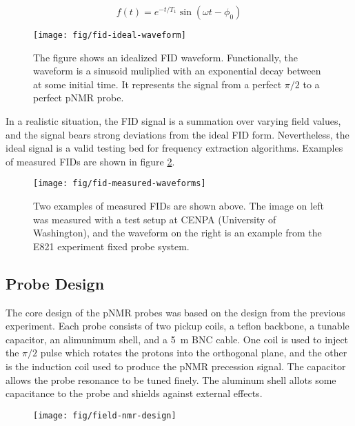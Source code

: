 \begin{equation}
f(t) = e^{-t/T_1} \sin(\omega t - \phi_0)
\label{eqn:ideal-fid}
\end{equation}

\begin{figure}
\label{fig:fid-ideal-waveform}
\centering
\texttt{[image: fig/fid-ideal-waveform]}
\caption{The figure shows an idealized FID waveform. Functionally, the waveform is a sinusoid muliplied with an exponential decay between at some initial time.  It represents the signal from a perfect $\pi/2$ to a perfect pNMR probe.}
\end{figure}

In a realistic situation, the FID signal is a summation over varying field values, and the signal bears strong deviations from the ideal FID form.  Nevertheless, the ideal signal is a valid testing bed for frequency extraction algorithms.  Examples of measured FIDs are shown in figure \ref{fig:fid-measured-waveforms}.

\begin{figure}
\label{fig:fid-measured-waveforms}
\texttt{[image: fig/fid-measured-waveforms]}
\caption{Two examples of measured FIDs are shown above. The image on left was measured with a test setup at CENPA (University of Washington), and the waveform on the right is an example from the E821 experiment fixed probe system.}
\end{figure}


\subsection{Probe Design}

The core design of the pNMR probes was based on the design from the previous experiment. Each probe consists of two pickup coils, a teflon backbone, a tunable capacitor, an alimunimum shell, and a \SI{5}{\meter} BNC cable.  One coil is used to inject the $\pi/2$ pulse which rotates the protons into the orthogonal plane, and the other is the induction coil used to produce the pNMR precession signal.  The capacitor allows the probe resonance to be tuned finely.  The aluminum shell allots some capacitance to the probe and shields against external effects.

\begin{figure}
\label{fig:field-nmr-design}
\texttt{[image: fig/field-nmr-design]}
\caption{}
\end{figure}

